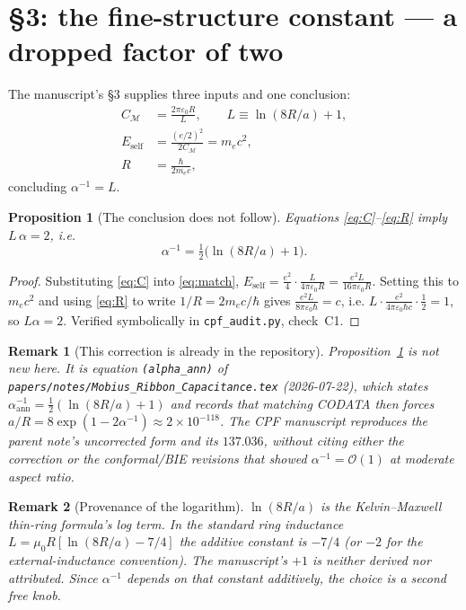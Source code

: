 \documentclass[11pt,a4paper]{article}
\newtheorem{proposition}{Proposition}
\newtheorem{remark}{Remark}
\begin{document}
\section{\S3: the fine-structure constant --- a dropped factor of two}
\label{sec:alpha}

The manuscript's \S3 supplies three inputs and one conclusion:
\begin{align}
C_{\mathcal{M}} &= \frac{2\pi\varepsilon_0 R}{L}, \qquad L \equiv \ln(8R/a)+1,
  \label{eq:C}\\
E_{\mathrm{self}} &= \frac{(e/2)^2}{2C_{\mathcal{M}}} = m_e c^2, \label{eq:match}\\
R &= \frac{\hbar}{2m_e c}, \label{eq:R}
\end{align}
concluding $\alpha^{-1} = L$.

\begin{proposition}[The conclusion does not follow]
\label{prop:factor2}
Equations \eqref{eq:C}--\eqref{eq:R} imply $L\,\alpha = 2$, i.e.
\[
\boxed{\;\alpha^{-1} = \tfrac12\bigl(\ln(8R/a)+1\bigr).\;}
\]
\end{proposition}

\begin{proof}
Substituting \eqref{eq:C} into \eqref{eq:match},
$E_{\mathrm{self}} = \frac{e^2}{4}\cdot\frac{L}{4\pi\varepsilon_0 R}
= \frac{e^2 L}{16\pi\varepsilon_0 R}$. Setting this to $m_e c^2$ and using
\eqref{eq:R} to write $1/R = 2m_ec/\hbar$ gives
$\frac{e^2 L}{8\pi\varepsilon_0\hbar} = c$, i.e.
$L\cdot\frac{e^2}{4\pi\varepsilon_0\hbar c}\cdot\frac12 = 1$, so $L\alpha = 2$.
Verified symbolically in \texttt{cpf\_audit.py}, check~C1.
\end{proof}

\begin{remark}[This correction is already in the repository]
Proposition~\ref{prop:factor2} is not new here. It is equation
\texttt{(alpha\_ann)} of \texttt{papers/notes/Mobius\_Ribbon\_Capacitance.tex}
(2026-07-22), which states $\alpha^{-1}_{\mathrm{ann}}=\tfrac12(\ln(8R/a)+1)$ and
records that matching CODATA then forces $a/R = 8\exp(1-2\alpha^{-1})\approx
2\times10^{-118}$. The CPF manuscript reproduces the parent note's \emph{uncorrected}
form and its $137.036$, without citing either the correction or the conformal/BIE
revisions that showed $\alpha^{-1}=\mathcal{O}(1)$ at moderate aspect ratio.
\end{remark}

\begin{remark}[Provenance of the logarithm]
$\ln(8R/a)$ is the Kelvin--Maxwell thin-ring formula's log term. In the standard
ring \emph{inductance} $L=\mu_0R[\ln(8R/a)-7/4]$ the additive constant is $-7/4$
(or $-2$ for the external-inductance convention). The manuscript's $+1$ is
neither derived nor attributed. Since $\alpha^{-1}$ depends on that constant
additively, the choice is a second free knob.
\end{remark}
\end{document}
